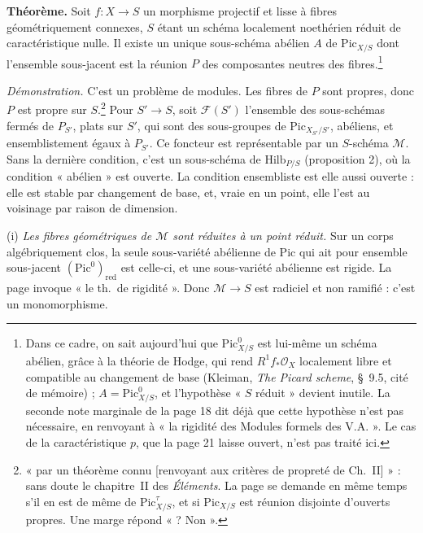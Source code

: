 \documentclass[11pt,a4paper]{article}
\begin{document}
\textbf{Théorème.} Soit $f \colon X \to S$ un morphisme projectif et lisse à
fibres géométriquement connexes, $S$ étant un schéma localement noethérien
réduit de caractéristique nulle. Il existe un unique sous-schéma abélien $A$
de $\mathrm{Pic}_{X/S}$ dont l'ensemble sous-jacent est la réunion $P$ des
composantes neutres des fibres.\footnote{Dans ce cadre, on sait aujourd'hui
que $\mathrm{Pic}^{0}_{X/S}$ est lui-même un schéma abélien, grâce à la
théorie de Hodge, qui rend $R^{1}f_{*}\mathcal{O}_X$ localement libre et
compatible au changement de base (Kleiman, \emph{The Picard scheme}, §~9.5,
cité de mémoire) ; $A = \mathrm{Pic}^{0}_{X/S}$, et l'hypothèse « $S$ réduit »
devient inutile. La seconde note marginale de la page 18 dit déjà que cette
hypothèse n'est pas nécessaire, en renvoyant à « la rigidité des Modules
formels des V.A. ». Le cas de la caractéristique $p$, que la page 21 laisse
ouvert, n'est pas traité ici.}

\emph{Démonstration.} C'est un problème de modules. Les fibres de $P$ sont
propres, donc $P$ est propre sur $S$.\footnote{« par un théorème connu
[renvoyant aux critères de propreté de Ch.~II] » : sans doute le chapitre~II
des \emph{Éléments}. La page se demande en même temps s'il en est de même de
$\mathrm{Pic}^{\tau}_{X/S}$, et si $\mathrm{Pic}_{X/S}$ est réunion disjointe
d'ouverts propres. Une marge répond « ? Non ».} Pour $S' \to S$, soit
$\mathcal{F}(S')$ l'ensemble des sous-schémas fermés de $P_{S'}$, plats sur
$S'$, qui sont des sous-groupes de $\mathrm{Pic}_{X_{S'}/S'}$, abéliens, et
ensemblistement égaux à $P_{S'}$. Ce foncteur est représentable par un
$S$-schéma $\mathcal{M}$. Sans la dernière condition, c'est un sous-schéma de
$\mathrm{Hilb}_{P/S}$ (proposition 2), où la condition « abélien » est
ouverte. La condition ensembliste est elle aussi ouverte : elle est stable par
changement de base, et, vraie en un point, elle l'est au voisinage par raison
de dimension.

(i) \emph{Les fibres géométriques de $\mathcal{M}$ sont réduites à un point
réduit.} Sur un corps algébriquement clos, la seule sous-variété abélienne de
$\mathrm{Pic}$ qui ait pour ensemble sous-jacent $(\mathrm{Pic}^{0})_{\mathrm{red}}$
est celle-ci, et une sous-variété abélienne est rigide. La page invoque « le
th.\ de rigidité ». Donc $\mathcal{M} \to S$ est radiciel et non ramifié :
c'est un monomorphisme.
\end{document}
